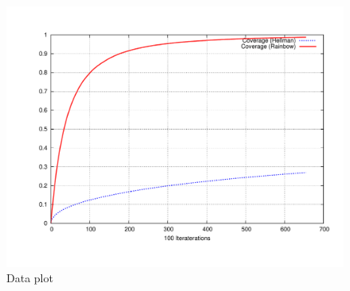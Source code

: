 \documentclass[10pt,a4paper]{article}
\begin{document}
\begin{figure}[h]
\centering
\includegraphics[scale=0.4]{../output/ex17a.pdf}
 \caption{Data plot}
 \label{fig:ex17a}
\end{figure}
\end{document}
